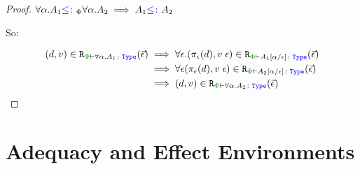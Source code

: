 \begin{proof}
\case{\squant}
$\forall \alpha. A_1{\color{blue} \leq\colon}_\Phi \forall \alpha. A_2\implies A_1{\color{blue} \leq\colon} A_2$

So:

\begin{align*}
    \inLogRelPE{d}{v}{\all{\a}{A_1}} & \implies \forall \e.\inLogRelPE{\pe(d)}{\eapp{v}{\e}}{A_1\ssub{\e}{\a}}\\
    & \implies \forall\e \inLogRelPE{\pe(d)}{\eapp{v}{\e}}{A_2\ssub{\e}{\a}}\\
    & \implies \inLogRelPE{d}{v}{\all{\a}{A_2}}
\end{align*}
\end{proof}

\section{Adequacy and Effect Environments}
\label{AdequacyEnvironmentsProof}

